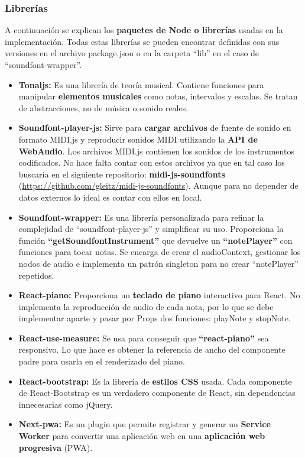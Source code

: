 \documentclass[12pt,twoside,titlepage]{report}
\begin{document}
\subsubsection{Librerías}
A continuación se explican los \textbf{paquetes de Node o librerías} usadas en la implementación. Todas estas librerías se pueden encontrar definidas con sus versiones en el archivo package.json o en la carpeta ``lib'' en el caso de ``soundfont-wrapper''.

\begin{itemize}
    \item \textbf{Tonaljs:} Es una librería de teoría musical. Contiene funciones para manipular \textbf{elementos musicales} como notas, intervalos y escalas. Se tratan de abstracciones, no de música o sonido reales.
    \item \textbf{Soundfont-player-js:} Sirve para \textbf{cargar archivos} de fuente de sonido en formato MIDI.js y reproducir sonidos MIDI utilizando la \textbf{API de WebAudio}. Los archivos MIDI.js contienen los sonidos de los instrumentos codificados. No hace falta contar con estos archivos ya que en tal caso los buscaría en el siguiente repositorio: \textbf{midi-js-soundfonts} (\url{https://github.com/gleitz/midi-js-soundfonts}). Aunque para no depender de datos externos lo ideal es contar con ellos en local.
    \item \textbf{Soundfont-wrapper:} Es una librería personalizada para refinar la complejidad de ``soundfont-player-js'' y simplificar su uso. Proporciona la función \textbf{``getSoundfontInstrument''} que devuelve un \textbf{``notePlayer''} con funciones para tocar notas. Se encarga de crear el audioContext, gestionar los nodos de audio e implementa un patrón singleton para no crear ``notePlayer'' repetidos.
    \item \textbf{React-piano:} Proporciona un \textbf{teclado de piano} interactivo para React. No implementa la reproducción de audio de cada nota, por lo que se debe implementar aparte y pasar por Props dos funciones: playNote y stopNote.
    \item \textbf{React-use-measure:} Se usa para conseguir que \textbf{``react-piano''} sea responsivo. Lo que hace es obtener la referencia de ancho del componente padre para usarla en el renderizado del piano.
    \item \textbf{React-bootstrap:} Es la librería de \textbf{estilos CSS} usada. Cada componente de React-Bootstrap es un verdadero componente de React, sin dependencias innecesarias como jQuery.
    \item \textbf{Next-pwa:} Es un plugin que permite registrar y generar un \textbf{Service Worker} para convertir una aplicación web en una \textbf{aplicación web progresiva} (PWA).
\end{itemize}
\end{document}
